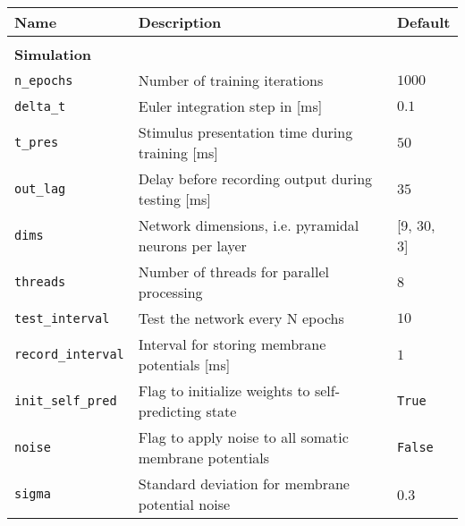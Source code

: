 \begin{table}
  \fontsize{12pt}{12pt}\selectfont
  \begin{center}
    \begin{tabular}{p{}p{}p{}}    \hline
      \textbf{Name}                & \textbf{Description}                                                        &
      \textbf{Default}
      \\
      \hline

      \\\textbf{Simulation} \\\hline
      \texttt{n\_epochs}           & Number of training iterations                                               &
      $1000$                                                                                                             \\
      \texttt{delta\_t}            & Euler integration step in [ms]                                              & $0.1$
      \\
      \texttt{t\_pres}             & Stimulus presentation time during training [ms]                             & $50$
      \\
      \texttt{out\_lag}            & Delay before recording output during testing [ms]                           & $35$
      \\
      \texttt{dims}                & Network dimensions, i.e. pyramidal neurons per layer                        & [9,
      30, 3]                                                                                                             \\
      \texttt{threads}             & Number of threads for parallel processing                                   & $8$
      \\
      \texttt{test\_interval}      & Test the network every N epochs                                             & $10$
      \\
      \texttt{record\_interval}    & Interval for storing membrane potentials [ms]                               & $1$
      \\
      \texttt{init\_self\_pred}    & Flag to initialize weights to self-predicting state                         &
      \texttt{True}
      \\
      \texttt{noise}               & Flag to apply noise to all somatic membrane potentials                      &
      \texttt{False}
      \\
      \texttt{sigma}               & Standard deviation for membrane potential noise                             & 0.3

\end{tabular}
\end{center}
\end{table}
